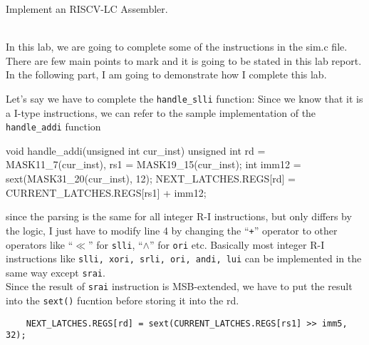 \documentclass[12pt, a4paper]{article}
\begin{document}
\begin{qNoMark}
Implement an RISCV-LC Assembler. 
\end{qNoMark}

\begin{ans}
\\\indent In this lab, we are going to complete some of the instructions in the sim.c file. 
There are few main points to mark and it is going to be stated in this lab report. 
In the following part, I am going to demonstrate how I complete this lab. 

Let's say we have to complete the \texttt{handle\_slli} function: 
Since we know that it is a I-type instructions, we can refer to the sample implementation of the \texttt{handle\_addi} function
\begin{code}
void handle_addi(unsigned int cur_inst) {
    unsigned int rd = MASK11_7(cur_inst), rs1 = MASK19_15(cur_inst);
    int imm12 = sext(MASK31_20(cur_inst), 12);
    NEXT_LATCHES.REGS[rd] = CURRENT_LATCHES.REGS[rs1] + imm12;
}
\end{code}
since the parsing is the same for all integer R-I instructions, but only differs by the logic, I just have to modify line 4
by changing the ``\texttt{+}'' operator to other operators like ``$\ll$'' for \texttt{slli}, ``$\wedge$'' for \texttt{ori} etc. 
Basically most integer R-I instructions like \texttt{slli, xori, srli, ori, andi, lui} can be implemented in the same way except \texttt{srai}. 
\\Since the result of \texttt{srai} instruction is MSB-extended, we have to put the result into the \texttt{sext()} fucntion before storing it into the rd. 
\begin{verbatim}
    NEXT_LATCHES.REGS[rd] = sext(CURRENT_LATCHES.REGS[rs1] >> imm5, 32);
\end{verbatim}



\end{ans}
\end{document}
